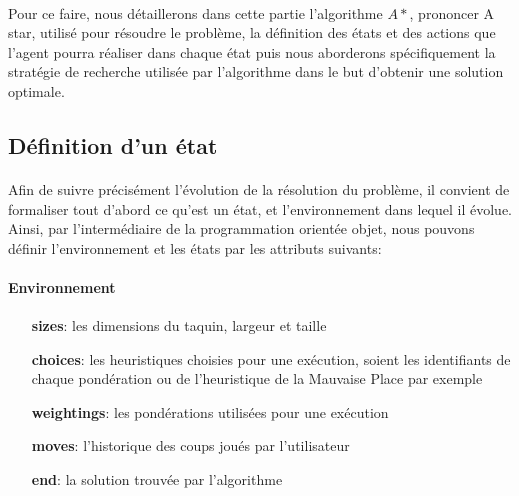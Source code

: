 \documentclass[10pt,a4paper]{report}
\begin{document}
\paragraph{}{Pour ce faire, nous détaillerons dans cette partie l’algorithme ${A*}$, prononcer A star, utilisé pour résoudre le problème, la définition des états et des actions que l’agent pourra réaliser dans chaque état puis nous aborderons spécifiquement la stratégie de recherche utilisée par l’algorithme dans le but d'obtenir une solution optimale.}
\subsection{Définition d’un état}
\paragraph{}{Afin de suivre précisément l’évolution de la résolution du problème, il convient de formaliser tout d’abord ce qu'est un état, et l'environnement dans lequel il évolue. Ainsi, par l'intermédiaire de la programmation orientée objet, nous pouvons définir l'environnement et les états par les attributs suivants:}
\paragraph{Environnement}
\begin{itemize}
\item [{\ttfamily\bfseries sizes}:] {les dimensions du taquin, largeur et taille}
\item [{\ttfamily\bfseries choices}:] {les heuristiques choisies pour une exécution, soient les identifiants de chaque pondération ou de l'heuristique de la Mauvaise Place par exemple}
\item [{\ttfamily\bfseries weightings}:] {les pondérations utilisées pour une exécution}
\item [{\ttfamily\bfseries moves}:] {l'historique des coups joués par l'utilisateur}
\item [{\ttfamily\bfseries end}:] {la solution trouvée par l'algorithme}
\end{itemize}
\end{document}
